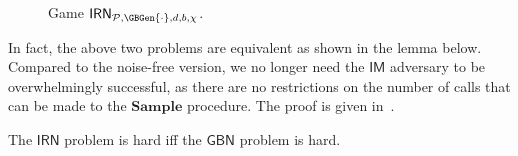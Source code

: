 \documentclass[draft]{llncs}
\newcommand{\IM}{\ensuremath{\mathsf{IM}}\xspace}
\newcommand{\GBN}{\ensuremath{\mathsf{GBN}}\xspace}
\newcommand{\IRN}{\ensuremath{\mathsf{IRN}}\xspace}
\newcommand{\Finalize}{\mathbf{Finalize}}
\newcommand{\Sample}{\mathbf{Sample}}
\newcommand{\px}{\phantom{i}}
\begin{document}
\begin{definition}
\begin{figure}[ht]
{
}
\caption{Game $\IRN_{\mathcal{P},\GBGen{\cdot},d,b,\chi}$.}
\label{fig.irn}
\vspace{-6mm} \end{figure}
\end{definition}
In fact, the above two problems are equivalent as shown in the lemma below. Compared to the noise-free version, we no longer need the \IM adversary to be overwhelmingly successful, as there are  no restrictions on the number of calls that can be made to the $\Sample$ procedure. The proof is given in~\cite{full}. 
\begin{lemma}
The \IRN problem is hard iff the \GBN problem is hard. \label{lem:IRN=GBN}
\end{lemma}
\end{document}
